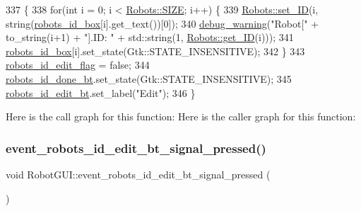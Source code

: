 \begin{DoxyCode}
337                                                       \{
338     \textcolor{keywordflow}{for}(\textcolor{keywordtype}{int} i = 0; i < \hyperlink{class_robots_ae9df2f1d345ad6740f0459956cdd4712}{Robots::SIZE}; i++) \{
339         \hyperlink{class_robots_aea3f1278d0503cd81adc9ceea0a7d1df}{Robots::set\_ID}(i, \textcolor{keywordtype}{string}(\hyperlink{class_robot_g_u_i_a1e475a8f99d5f0b3b29286731ddf0550}{robots\_id\_box}[i].get\_text())[0]);
340         \hyperlink{debug_8hpp_a82185c5a131fe76d2d21364ef6db6144}{debug\_warning}(\textcolor{stringliteral}{"Robot["} + to\_string(i+1) +  \textcolor{stringliteral}{"].ID: "} + std::string(1, 
      \hyperlink{class_robots_a306bb88b37b41cff35018d51d8228d65}{Robots::get\_ID}(i)));
341         \hyperlink{class_robot_g_u_i_a1e475a8f99d5f0b3b29286731ddf0550}{robots\_id\_box}[i].set\_state(Gtk::STATE\_INSENSITIVE);
342     \}
343     \hyperlink{class_robot_g_u_i_a27cecf0c25aaf4ad01c712945008d4de}{robots\_id\_edit\_flag} = \textcolor{keyword}{false};
344     \hyperlink{class_robot_g_u_i_ab69f2927774ee6e1feef6e1e175bf5ba}{robots\_id\_done\_bt}.set\_state(Gtk::STATE\_INSENSITIVE);
345     \hyperlink{class_robot_g_u_i_aa74c3aa318e937124b6bd8cc1139ffbd}{robots\_id\_edit\_bt}.set\_label(\textcolor{stringliteral}{"Edit"});
346 \}
\end{DoxyCode}
Here is the call graph for this function\+:
Here is the caller graph for this function\+:
\mbox{\label{class_robot_g_u_i_a37c09ff17bc02e83aa616ac798b87ee7}} 
\subsubsection{\texorpdfstring{event\+\_\+robots\+\_\+id\+\_\+edit\+\_\+bt\+\_\+signal\+\_\+pressed()}{event\_robots\_id\_edit\_bt\_signal\_pressed()}}
{\footnotesize\ttfamily void Robot\+G\+U\+I\+::event\+\_\+robots\+\_\+id\+\_\+edit\+\_\+bt\+\_\+signal\+\_\+pressed (\begin{DoxyParamCaption}{ }\end{DoxyParamCaption})\hspace{0.3cm}{\ttfamily [private]}}

